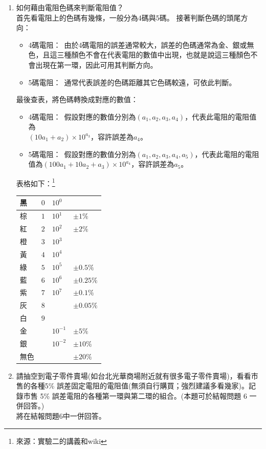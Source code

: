 \documentclass[12pt, a4paper]{article}
\def\large{\fontsize{14}{21}\selectfont}
\begin{document}
\begin{enumerate}[itemsep=20pt, topsep=10pt]
	\item {\large 如何藉由電阻色碼來判斷電阻值？} \\[10pt]
		首先看電阻上的色碼有幾條，一般分為4碼與5碼。
		接著判斷色碼的頭尾方向：
		\begin{itemize}
			\item 4碼電阻：\ 由於4碼電阻的誤差通常較大，誤差的色碼通常為金、銀或無色，且這三種顏色不會在代表電阻的數值中出現，也就是說這三種顏色不會出現在第一環，因此可用其判斷方向。
			\item 5碼電阻：\ 通常代表誤差的色碼距離其它色碼較遠，可依此判斷。
		\end{itemize}
		最後查表，將色碼轉換成對應的數值：
		\begin{itemize}
			\item 4碼電阻：\ 假設對應的數值分別為$(a_1, a_2, a_3, a_4)$，代表此電阻的電阻值為\\$(10 a_1 + a_2 ) \times 10^{a_3}$，容許誤差為$a_4$。
			\item 5碼電阻：\ 假設對應的數值分別為$(a_1, a_2, a_3, a_4, a_5)$，代表此電阻的電阻值為$(100 a_1 + 10a_2 + a_3) \times 10^{a_4}$，容許誤差為$a_5$。
			\end{itemize}
			表格如下：\footnote{來源：實驗二的講義和wiki}
		\begin{center}
		\begin{tabular}{|p{3cm}|p{3cm}|p{3cm}|p{3cm}|}
\hline
黑 & $0$ & $10^{0}$ & \\
\hline
棕 & $1$ & $10^{1}$ & $\pm 1\%$ \\
\hline
紅 & $2$ & $10^{2}$ & $\pm 2\%$ \\
\hline
橙 & $3$ & $10^{3}$ & \\
\hline
黃 & $4$ & $10^{4}$ & \\
\hline
綠 & $5$ & $10^{5}$ & $\pm 0.5\%$ \\
\hline
藍 & $6$ & $10^{6}$ & $\pm 0.25\%$ \\
\hline
紫 & $7$ & $10^{7}$ & $\pm 0.1\%$ \\
\hline
灰 & $8$ &  & $\pm 0.05\%$ \\
\hline
白 & $9$ &  & \\
\hline
金 &  & $10^{-1}$ & $\pm 5\%$ \\
\hline
銀 &  & $10^{-2}$ & $\pm 10\%$ \\
\hline
無色 &  &  & $\pm 20\%$ \\
\hline
		\end{tabular}
		\end{center}

		\item {\large 請抽空到電子零件賣場(如台北光華商場附近就有很多電子零件賣場)，看看市售的各種5\% 誤差固定電阻的電阻值(無須自行購買；強烈建議多看幾家)。記錄市售 5\% 誤差電阻的各種第一環與第二環的組合。(本題可於結報問題 6 一併回答。) } \\[10pt]
		將在結報問題6中一併回答。
\end{enumerate}
\end{document}
